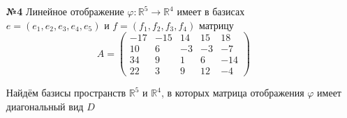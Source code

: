 \documentclass[a4paper]{article}
\begin{document}
\begin{enumerate}
    \item[\textbf{№4}]Линейное отображение
     $\varphi: \mathbb{R}^{5} \rightarrow \mathbb{R}^{4}$
      имеет в базисах 
      $e=\left(e_{1}, e_{2}, e_{3}, e_{4}, e_{5}\right)$ и 
      $f=\left(f_{1}, f_{2}, f_{3}, f_{4}\right)$ матрицу
    $$
    A=\left(\begin{array}{ccccc}
    -17 & -15 & 14 & 15 & 18 \\
    10 & 6 & -3 & -3 & -7 \\
    34 & 9 & 1 & 6 & -14 \\
    22 & 3 & 9 & 12 & -4
    \end{array}\right)
    $$
    
    Найдём базисы пространств $\mathbb{R}^{5}$ и $\mathbb{R}^{4}$, 
    в которых матрица отображения $\varphi$ имеет диагональный вид $D$
    

\end{enumerate}
\end{document}
